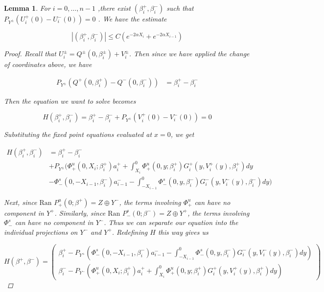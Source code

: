 \documentclass[12pt]{article}
\newtheorem{lemma}{Lemma}
\begin{document}
\begin{lemma}\label{solveforbeta}
For $i = 0, \dots, n-1$ ,there exist $(\beta_i^+, \beta_i^-)$ such that $P_{Y^\pm}(U_i^+(0) - U_i^-(0)) = 0$ . We have the estimate

\begin{equation}
| (\beta_i^+, \beta_i^-) | \leq C (e^{-2 \alpha X_i} + e^{-2 \alpha X_{i-1}})
\end{equation}

\begin{proof}
Recall that $U_i^\pm = Q^\pm(0, \beta_i^\pm) + V_i^\pm$. Then since we have applied the change of coordinates above, we have

\begin{align*}
P_{Y^\pm}(Q^+(0, \beta_i^+) - Q^-(0, \beta_i^-)) &= \beta_i^+ - \beta_i^-
\end{align*}

Then the equation we want to solve becomes

\begin{equation}
H(\beta_i^+, \beta_i^-) = \beta_i^+ - \beta_i^- 
+ P_{Y^\pm}(V_i^+(0) - V_i^-(0)) = 0
\end{equation}

Substituting the fixed point equations evaluated at $x = 0$, we get

\begin{align*}
H(\beta_i^+, \beta_i^-) &= \beta_i^+ - \beta_i^- \\
&+ P_{Y^\pm} \Big( \Phi^u_+(0, X_i; \beta_i^+) a_i^+ 
+ \int_{X_i}^0 \Phi_+^u(0, y; \beta_i^+) G_i^+(y, V_i^+(y),\beta_i^+)dy \\
&- \Phi^s_-(0, -X_{i-1}, \beta_i^-) a_{i-1}^- 
- \int_{-X_{i-1}}^0 \Phi_-^s(0, y, \beta_i^-) G_i^-(y, V_i^-(y),\beta_i^-) dy \Big) 
\end{align*}

Next, since $\text{Ran }P_+^u(0; \beta^+) = Z \oplus Y^-$, the terms involving $\Phi^u_+$ can have no component in $Y^+$. Similarly, since $\text{Ran }P_-^s(0; \beta^-) = Z \oplus Y^+$, the terms involving $\Phi^s_-$ can have no component in $Y^-$. Thus we can separate our equation into the individual projections on $Y^-$ and $Y^+$. Redefining $H$ this way gives us

\begin{equation}
H(\beta^+, \beta^-) = 
\begin{pmatrix}
\beta_i^+ - P_{Y^+}\left(\Phi^s_-(0, -X_{i-1}, \beta_i^-) a_{i-1}^- 
- \int_{-X_{i-1}}^0 \Phi_-^s(0, y, \beta_i^-) G_i^-(y, V_i^-(y),\beta_i^-) dy\right) \\
\beta_i^- - P_{Y^-}\left( \Phi^u_+(0, X_i; \beta_i^+) a_i^+ 
+ \int_{X_i}^0 \Phi_+^u(0, y; \beta_i^+) G_i^+(y, V_i^+(y),\beta_i^+)dy \right)
\end{pmatrix}
\end{equation}


\end{proof}
\end{lemma}
\end{document}
